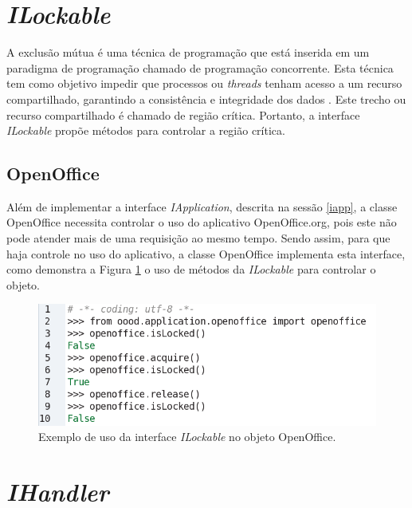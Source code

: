 \section{\textit{ILockable}}

A exclusão mútua é uma técnica de programação que está inserida em um paradigma de programação chamado de programação concorrente. Esta técnica tem como objetivo impedir que processos ou \textit{threads} tenham acesso a um recurso compartilhado, garantindo a consistência e integridade dos dados \cite{355074}. Este trecho ou recurso compartilhado é chamado de região crítica. Portanto, a interface \textit{ILockable} propõe métodos para controlar a região crítica.

\subsection{OpenOffice}

Além de implementar a interface \textit{IApplication}, descrita na sessão \ref{iapp}, a classe OpenOffice necessita controlar o uso do aplicativo OpenOffice.org, pois este não pode atender mais de uma requisição ao mesmo tempo. Sendo assim, para que haja controle no uso do aplicativo, a classe OpenOffice implementa esta interface, como demonstra a Figura \ref{fig:oo_lockable} o uso de métodos da \textit{ILockable} para controlar o objeto.

\begin{figure}[!ht]
\centering
\begin{center}
\includegraphics[scale=0.610,bb=0 0 500 146]{open_lockable.png}
\end{center}
\caption{Exemplo de uso da interface \textit{ILockable} no objeto OpenOffice.}
\label{fig:oo_lockable}
\end{figure}

\section{\textit{IHandler}}

